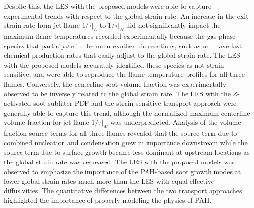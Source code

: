 Despite this, the LES with the proposed models were able to capture experimental trends with respect to the global strain rate. An increase in the exit strain rate from jet flame $1/\tau|_L$ to $1/\tau|_H$ did not significantly impact the maximum flame temperatures recorded experimentally because the gas-phase species that participate in the main exothermic reactions, such as  or , have fast chemical production rates that easily adjust to the global strain rate. The LES with the proposed models accurately identified these species as not strain-sensitive, and were able to reproduce the flame temperature profiles for all three flames. Conversely, the centerline soot volume fraction was experimentally observed to be inversely related to the global strain rate. The LES with the $Z$-activated soot subfilter PDF and the strain-sensitive transport approach were generally able to capture this trend, although the normalized maximum centerline volume fraction for jet flame $1/\tau|_M$ was underpredicted. Analysis of the volume fraction source terms for all three flames revealed that the source term due to combined nucleation and condensation grew in importance downstream while the source term due to surface growth became less dominant at upstream locations as the global strain rate was decreased. The LES with the proposed models was observed to emphasize the importance of the PAH-based soot growth modes at lower global strain rates much more than the LES with equal effective diffusivities. The quantitative differences between the two transport approaches highlighted the importance of properly modeling the physics of PAH.



